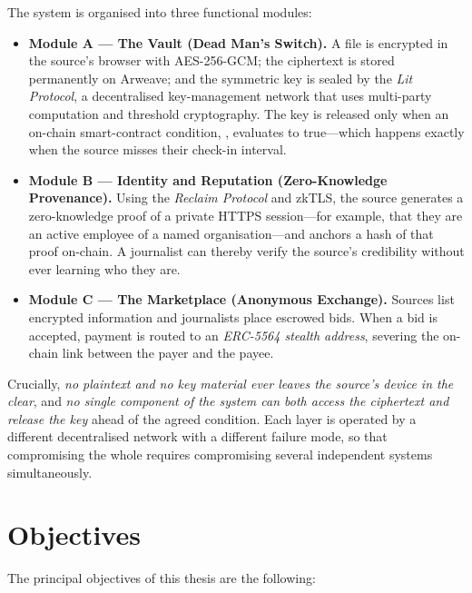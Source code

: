 The system is organised into three functional modules:

\begin{itemize}
  \item \textbf{Module A --- The Vault (Dead Man's Switch).} A file is encrypted
  in the source's browser with AES-256-GCM; the ciphertext is stored permanently
  on Arweave; and the symmetric key is sealed by the \emph{Lit Protocol}, a
  decentralised key-management network that uses multi-party computation and
  threshold cryptography. The key is released only when an on-chain
  smart-contract condition, \isdeceased, evaluates to true---which happens
  exactly when the source misses their check-in interval.

  \item \textbf{Module B --- Identity and Reputation (Zero-Knowledge
  Provenance).} Using the \emph{Reclaim Protocol} and zkTLS, the source generates
  a zero-knowledge proof of a private HTTPS session---for example, that they are
  an active employee of a named organisation---and anchors a hash of that proof
  on-chain. A journalist can thereby verify the source's credibility without ever
  learning who they are.

  \item \textbf{Module C --- The Marketplace (Anonymous Exchange).} Sources list
  encrypted information and journalists place escrowed bids. When a bid is
  accepted, payment is routed to an \emph{ERC-5564 stealth address}, severing the
  on-chain link between the payer and the payee.
\end{itemize}

Crucially, \emph{no plaintext and no key material ever leaves the source's
device in the clear}, and \emph{no single component of the system can both access
the ciphertext and release the key} ahead of the agreed condition. Each layer is
operated by a different decentralised network with a different failure mode, so
that compromising the whole requires compromising several independent systems
simultaneously.

\section{Objectives}
\label{sec:intro-objectives}

The principal objectives of this thesis are the following:

